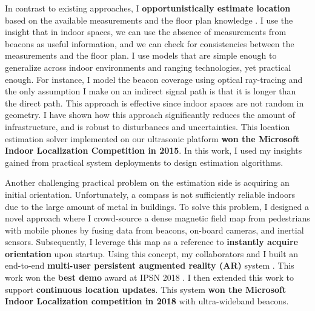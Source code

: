 \documentclass[10pt]{article}
\begin{document}
In contrast to existing approaches, I \textbf{opportunistically estimate location} based on the available measurements and the floor plan knowledge \cite{rajagopal2018enhancing}. I use the insight that in indoor spaces, we can use the absence of measurements from beacons as useful information, and we can check for consistencies between the measurements and the floor plan. I use models that are simple enough to generalize across indoor environments and ranging technologies, yet practical enough. For instance, I model the beacon coverage using optical ray-tracing and the only assumption I make on an indirect  signal path is that it is longer than the direct path. This approach is effective since indoor spaces are not random in geometry.  %
I have shown how this approach significantly reduces the amount of infrastructure, and is robust to %
disturbances and uncertainties. %
This location estimation solver implemented on our ultrasonic platform \textbf{won the Microsoft Indoor Localization Competition in 2015}. In this work, I used my insights gained from practical system deployments to design estimation algorithms.%

Another challenging practical problem on the estimation side is acquiring an initial orientation. Unfortunately, a compass is not sufficiently reliable indoors due to the large amount of metal in buildings. 
To solve this problem, I designed a novel approach where I crowd-source a dense magnetic field map from pedestrians with mobile phones by fusing data from beacons, on-board cameras, and inertial sensors. Subsequently, I leverage this map as a reference to \textbf{instantly acquire orientation} upon startup. 
Using this concept, my collaborators and I built an end-to-end \textbf{multi-user persistent augmented reality (AR)} system \cite{mobileAR}. This work won the \textbf{best demo} award at IPSN 2018 \cite{rajagopal2018welcome}. I then extended this work to support \textbf{continuous location updates}. This system \textbf{won the Microsoft Indoor Localization competition in 2018} with ultra-wideband beacons.  
\end{document}
